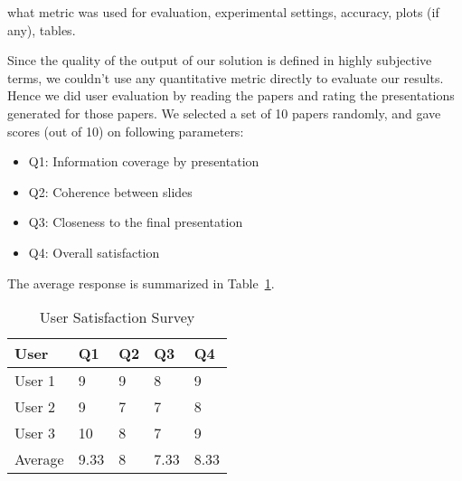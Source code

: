 what metric was used for evaluation, experimental settings, accuracy, plots (if any), tables.

Since the quality of the output of our solution is defined
in highly subjective terms, we couldn't use any quantitative metric
directly to evaluate our results. Hence we did user evaluation by reading
the papers and rating the presentations generated for those papers.
We selected a set of 10 papers randomly, and gave scores (out of 10) on following 
parameters:
\begin{itemize}
	\item Q1: Information coverage by presentation
	\item Q2: Coherence between slides
	\item Q3: Closeness to the final presentation
	\item Q4: Overall satisfaction
\end{itemize}
The average response is summarized in Table~\ref{tbl1:users}.

\begin{table}
\begin{center}
\caption{User Satisfaction Survey}
\begin{tabular}{| l | l | l | l | l |}
\hline
User & Q1 & Q2 & Q3 & Q4 \\ \hline
User 1 & 9 & 9 & 8 & 9 \\ 
User 2 & 9 & 7 & 7 & 8 \\ 
User 3 & 10 & 8 & 7 & 9 \\ \hline
Average & 9.33 & 8 & 7.33 & 8.33 \\ \hline
\end{tabular}
\label{tbl1:users}
\end{center}
\end{table}	


